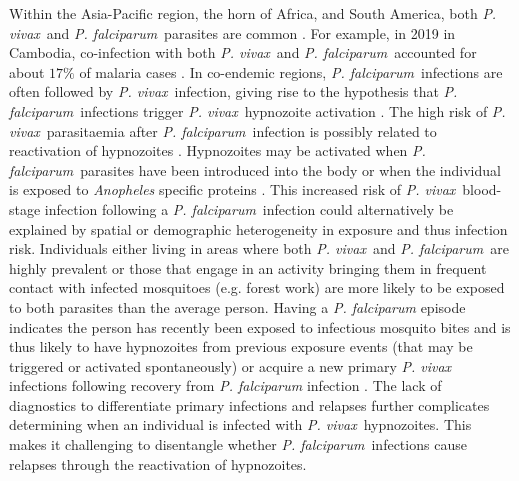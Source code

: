 \documentclass[12pt]{article}
\newcommand{\pv}{\textit{P. vivax}}
\newcommand{\pf}{\textit{P. falciparum}}
\begin{document}
Within the Asia-Pacific region, the horn of Africa, and South America, both \pv~and \pf~parasites are common \cite{silal2019malaria,walker2023model}. For example, in 2019 in Cambodia, co-infection with both \pv~and \pf~accounted for about $17\%$ of malaria cases \cite{chhim2021malaria}. In co-endemic regions, \pf~infections are often followed by \pv~infection, giving rise to the hypothesis that \pf~infections trigger \pv~hypnozoite activation \cite{snounou2004co,white2011determinants,lin2011plasmodium,silal2019malaria}. The high risk of \pv~parasitaemia after \pf~infection is possibly related to reactivation of hypnozoites \cite{taylor_resolving_2019,hossain_risk_2020,commons_risk_2019}. Hypnozoites may be activated when \pf~parasites have been introduced into the body \cite{shanks2013activation} or when the individual is exposed to \textit{Anopheles} specific proteins \cite{hulden2011activation}. This increased risk of \pv~blood-stage infection following a \pf~infection could alternatively be explained by spatial or demographic heterogeneity in exposure and thus infection risk. Individuals either living in areas where both \pv~and \pf~are highly prevalent or those that engage in an activity bringing them in frequent contact with infected mosquitoes (e.g. forest work) are more likely to be exposed to both parasites than the average person. Having a \textit{P. falciparum} episode indicates the person has recently been exposed to infectious mosquito bites and is thus likely to have hypnozoites from previous exposure events (that may be triggered or activated spontaneously) or acquire a new primary \textit{P. vivax} infections following recovery from \textit{P. falciparum} infection \cite{amratia2019characterizing,haque2010spatial,hofmann2017complex}. The lack of diagnostics to differentiate primary infections and relapses further complicates determining when an individual is infected with \pv~hypnozoites. This makes it challenging to disentangle whether \pf~infections cause relapses through the reactivation of hypnozoites.
\end{document}
